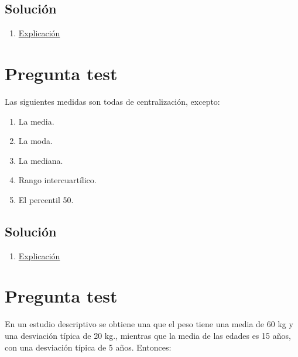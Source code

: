 \documentclass[
]{book}
\providecommand{\tightlist}{%
  \setlength{\itemsep}{0pt}\setlength{\parskip}{0pt}}
\begin{document}
\hypertarget{soluciuxf3n-29}{%
\subsection{Solución}\label{soluciuxf3n-29}}

\begin{enumerate}
\def\labelenumi{\alph{enumi})}
\setcounter{enumi}{4}
\tightlist
\item
  \href{https://1fjmanzano.github.io/bioestadistica/medidas-de-posicio\%CC\%81n-dispersio\%CC\%81n-y-forma.html\#medidas-de-posicio\%CC\%81n-centrales}{Explicación}
\end{enumerate}

\hypertarget{pregunta-test-28}{%
\section{Pregunta test}\label{pregunta-test-28}}

Las siguientes medidas son todas de centralización, excepto:

\begin{enumerate}
\def\labelenumi{\alph{enumi})}
\tightlist
\item
  La media.
\item
  La moda.
\item
  La mediana.
\item
  Rango intercuartílico.
\item
  El percentil 50.
\end{enumerate}

\hypertarget{soluciuxf3n-30}{%
\subsection{Solución}\label{soluciuxf3n-30}}

\begin{enumerate}
\def\labelenumi{\alph{enumi})}
\setcounter{enumi}{3}
\tightlist
\item
  \href{https://1fjmanzano.github.io/bioestadistica/medidas-de-posicio\%CC\%81n-dispersio\%CC\%81n-y-forma.html\#medidas-de-posicio\%CC\%81n-centrales}{Explicación}
\end{enumerate}

\hypertarget{pregunta-test-29}{%
\section{Pregunta test}\label{pregunta-test-29}}

En un estudio descriptivo se obtiene una que el peso tiene una media de 60 kg y una desviación típica de 20 kg., mientras que la media de las edades es 15 años, con una desviación típica de 5 años. Entonces:
\end{document}
